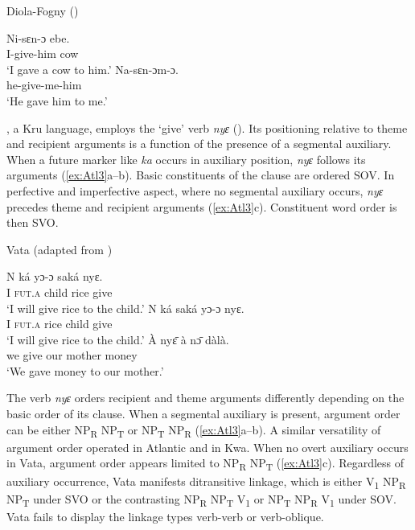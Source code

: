 \documentclass[output=paper,colorlinks,citecolor=brown]{langscibook}
\begin{document}
\ea \label{ex:Atl2} Diola-Fogny (\cite[30]{Sapir1965})
\begin{xlist}
\ex
\gll Ni-sɛn-ɔ				ebe.\\
						I-give-him		cow\\
\glt						‘I gave a cow to him.’
\ex
\gll Na-sɛn-ɔm-ɔ.\\
						he-give-me-him\\
\glt 						‘He gave him to me.’
\end{xlist}
\z

, a Kru language, employs the ‘give’ verb \textit{nyɛ} (\citealt{Koopman1984}). Its positioning relative to theme and recipient arguments is a function of the presence of a segmental auxiliary. When a future marker like \textit{ka} occurs in auxiliary position, \textit{nyɛ} follows its arguments (\ref{ex:Atl3}a--b). Basic constituents of the clause are ordered SOV. In perfective and imperfective aspect, where no segmental auxiliary occurs, \textit{nyɛ} precedes theme and recipient arguments (\ref{ex:Atl3}c). Constituent word order is then SVO.

\ea \label{ex:Atl3} Vata (adapted from \citealt[29, 157]{Koopman1984})
\begin{xlist}
\ex
\gll N		ká						yɔ-ɔ			saká	nyɛ.\\
						I		\textsc{fut.a}		child		rice		give\\
\glt						‘I will give rice to the child.’
\ex
\gll 	N		ká				saká	yɔ-ɔ 	nyɛ.\\
						I		\textsc{fut.a}	rice		child	give\\
\glt						‘I will give rice to the child.’
\ex
\gll 	À			nyɛ̄		à			nɔ̄					dàlà.\\
						we		give		our	mother		money\\
\glt						‘We gave money to our mother.’
\end{xlist}
\z

The verb \textit{nyɛ} orders recipient and theme arguments differently depending on the basic order of its clause. When a segmental auxiliary is present, argument order can be either NP\textsubscript{R} NP\textsubscript{T} or NP\textsubscript{T} NP\textsubscript{R} (\ref{ex:Atl3}a--b). A similar versatility of argument order operated in Atlantic  and in  Kwa. When no overt auxiliary occurs in Vata, argument order appears limited to NP\textsubscript{R} NP\textsubscript{T} (\ref{ex:Atl3}c). Regardless of auxiliary occurrence, Vata manifests ditransitive linkage, which is either V\textsubscript{1} NP\textsubscript{R} NP\textsubscript{T} under SVO or the contrasting NP\textsubscript{R} NP\textsubscript{T} V\textsubscript{1} or NP\textsubscript{T} NP\textsubscript{R} V\textsubscript{1} under SOV. Vata fails to display the linkage types verb-verb or verb-oblique.
\end{document}

